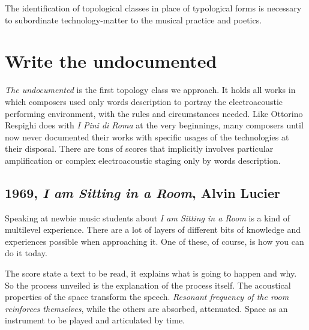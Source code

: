 \documentclass[twoside,a4paper]{article}
\begin{document}
The identification of topological classes in place of typological forms is necessary to subordinate technology-matter to the musical practice and poetics. %


\section{Write the undocumented}
\label{sec:writing}

\emph{The undocumented} is the first topology class we approach. It holds all works in which composers used only words description to portray the electroacoustic performing environment, with the rules and circumstances needed. Like Ottorino Respighi does with \emph{I Pini di Roma} at the very beginnings, many composers until now never documented their works with specific usages of the technologies at their disposal. There are tons of scores that implicitly involves particular amplification or complex electroacoustic staging only by words description. 


\subsection{1969, \emph{I am Sitting in a Room}, Alvin Lucier}

Speaking at newbie music students about \emph{I am Sitting in a Room} is a kind of multilevel experience. There are a lot of layers of different bits of knowledge and experiences possible when approaching it. One of these, of course, is how you can do it today. 

The score state a text to be read, it explains what is going to happen and why. So the process unveiled is the explanation of the process itself. The acoustical properties of the space transform the speech. \emph{Resonant frequency of the room reinforces themselves}, while the others are absorbed, attenuated. Space as an instrument to be played and articulated by time. 
\end{document}

